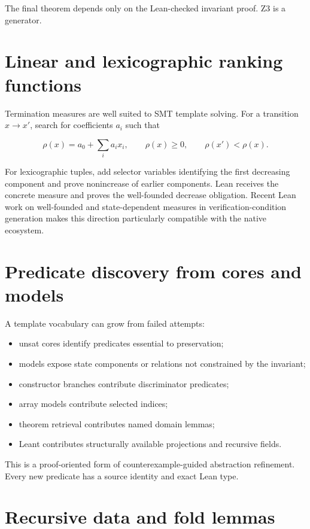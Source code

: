 \documentclass[11pt,letterpaper,openany]{report}
\begin{document}
The final theorem depends only on the Lean-checked invariant proof. Z3 is a generator.

\section{Linear and lexicographic ranking functions}

Termination measures are well suited to SMT template solving. For a transition
\(x \to x'\), search for coefficients \(a_i\) such that

\[
\rho(x)=a_0+\sum_i a_i x_i,
\qquad
\rho(x)\ge 0,
\qquad
\rho(x') < \rho(x).
\]

For lexicographic tuples, add selector variables identifying the first decreasing
component and prove nonincrease of earlier components. Lean receives the concrete
measure and proves the well-founded decrease obligation. Recent Lean work on
well-founded and state-dependent measures in verification-condition generation makes
this direction particularly compatible with the native ecosystem.

\section{Predicate discovery from cores and models}

A template vocabulary can grow from failed attempts:

\begin{itemize}
  \item unsat cores identify predicates essential to preservation;
  \item models expose state components or relations not constrained by the invariant;
  \item constructor branches contribute discriminator predicates;
  \item array models contribute selected indices;
  \item theorem retrieval contributes named domain lemmas;
  \item Leant contributes structurally available projections and recursive fields.
\end{itemize}

This is a proof-oriented form of counterexample-guided abstraction refinement. Every
new predicate has a source identity and exact Lean type.

\section{Recursive data and fold lemmas}
\end{document}
